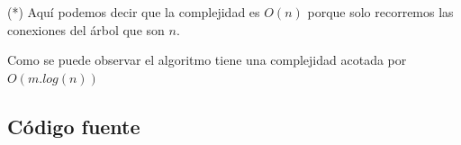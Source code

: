 (*) Aquí podemos decir que la complejidad es $O(n)$ porque solo recorremos las conexiones del árbol que son $n$.

Como se puede observar el algoritmo tiene una complejidad acotada por $O(m.log(n))$


\newpage


\subsection{C\'odigo fuente}

